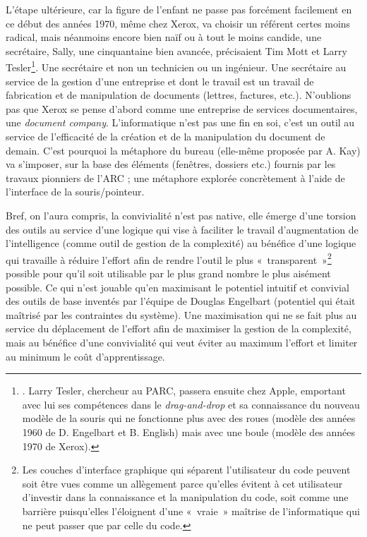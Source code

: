 \documentclass{FramateX}
\begin{document}
\begin{refsection}
L'étape ultérieure, car la figure de l'enfant ne passe pas forcément
facilement en ce début des années 1970, même chez Xerox, va choisir un
référent certes moins radical, mais néanmoins encore bien naïf ou à
tout le moins candide, une secrétaire, Sally, une cinquantaine bien
avancée, précisaient Tim Mott et Larry Tesler\footnote{\cite[p.~162]{bardinibootstrapping2001}. Larry Tesler,
chercheur au PARC, passera ensuite chez Apple, emportant avec lui ses
compétences dans le \textit{drag-and-drop} et sa connaissance du nouveau
modèle de la souris qui ne fonctionne plus avec des roues (modèle des
années 1960 de D. Engelbart et B. English) mais avec une boule (modèle
des années 1970 de Xerox).}. Une secrétaire et non un
technicien ou un ingénieur. Une secrétaire au service de la gestion
d'une entreprise et dont le travail est un travail de fabrication et de
manipulation de documents (lettres, factures, etc.). N'oublions pas que
Xerox se pense d'abord comme une entreprise de services documentaires,
une \textit{document company}. L'informatique n'est pas une fin en soi,
c'est un outil au service de l'efficacité de la création et de la
manipulation du document de demain. C'est pourquoi la
métaphore du bureau (elle-même proposée par A. Kay) va s'imposer,
sur la base des éléments (fenêtres, dossiers etc.) fournis par les
travaux pionniers de l'ARC ; une métaphore explorée concrètement à
l'aide de l'interface de la souris/pointeur.

Bref, on l'aura compris, la convivialité n'est pas native, elle émerge
d'une torsion des outils au service d'une logique qui vise à faciliter
le travail d'augmentation de l'intelligence (comme outil de gestion de
la complexité) au bénéfice d'une logique qui travaille à réduire
l'effort afin de rendre l'outil le plus «~transparent~»\footnote{Les
couches d'interface graphique qui séparent l'utilisateur du code
peuvent soit être vues comme un allègement parce qu'elles évitent à cet
utilisateur d'investir dans la connaissance et la manipulation du code,
soit comme une barrière puisqu'elles l'éloignent d'une «~vraie~»
maîtrise de l'informatique qui ne peut passer que par celle du code.}
 possible pour qu'il soit utilisable par le plus grand nombre
le plus aisément possible. Ce qui n'est jouable qu'en maximisant le
potentiel intuitif et convivial des outils de base inventés par
l'équipe de Douglas Engelbart (potentiel qui était maîtrisé par les
contraintes du système). Une maximisation qui ne se fait plus au
service du déplacement de l'effort afin de maximiser la gestion de la
complexité, mais au bénéfice d'une convivialité qui veut éviter au
maximum l'effort et limiter au minimum le coût d'apprentissage. 


\end{refsection}
\end{document}
